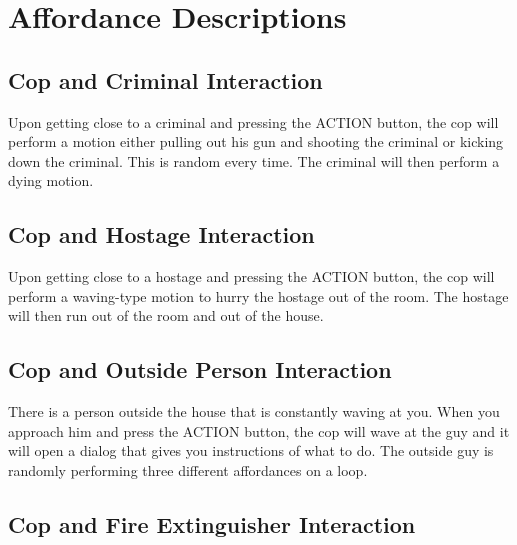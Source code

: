\documentclass[12pt]{article}
\begin{document}
\newpage


\section*{\center Affordance Descriptions}
\vspace{10pt}

\subsection*{Cop and Criminal Interaction}

Upon getting close to a criminal and pressing the ACTION button, the cop will perform a motion either pulling out his gun and shooting the criminal or kicking down the criminal. This is random every time. The criminal will then perform a dying motion.\\

\subsection*{Cop and Hostage Interaction}

Upon getting close to a hostage and pressing the ACTION button, the cop will perform a waving-type motion to hurry the hostage out of the room. The hostage will then run out of the room and out of the house. \\

\subsection*{Cop and Outside Person Interaction}

There is a person outside the house that is constantly waving at you. When you approach him and press the ACTION button, the cop will wave at the guy and it will open a dialog that gives you instructions of what to do. The outside guy is randomly performing three different affordances on a loop.\\

\subsection*{Cop and Fire Extinguisher Interaction}
\end{document}
